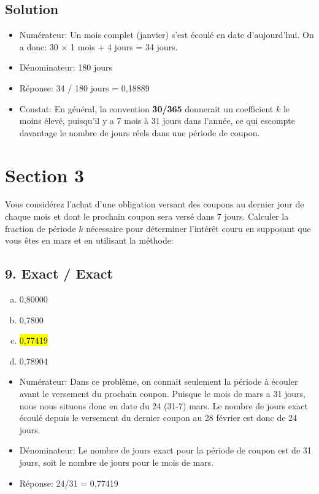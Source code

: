 \documentclass[10pt,a4paper]{article}
\begin{document}
\subsection*{Solution}
\begin{itemize}
\item Numérateur: Un mois complet (janvier) s'est écoulé en date d'aujourd'hui. On a donc: 30  × 1 mois + 4 jours = 34 jours.
\item Dénominateur: 180 jours
\item Réponse: 34 / 180 jours = 0,18889
\item Constat: En général, la convention \textbf{30/365} donnerait un coefficient $k$ le moins élevé,  puisqu'il y a 7 mois à 31 jours dans l'année, ce qui escompte davantage le nombre de jours réels dans une période de coupon.
\end{itemize}
\newpage 


\section*{Section 3}
Vous considérez l’achat d’une obligation versant des coupons au dernier jour de chaque mois et dont le prochain coupon sera versé dans 7 jours. Calculer la fraction de période $k$ nécessaire pour déterminer l’intérêt couru en supposant que vous êtes en mars et en utilisant la méthode: 

\subsection*{9.  Exact / Exact} 
\begin{enumerate}[a)]
\item 0,80000 
\item 0,7800
\item \hl{0,77419}
\item 0,78904 
\end{enumerate}
\begin{itemize}
\item Numérateur: Dans ce problème, on connait seulement la période à écouler avant le versement du prochain coupon.  Puisque le mois de mars a 31 jours, nous nous situons donc en date du 24 (31-7) mars. Le nombre de jours exact écoulé depuis le versement du dernier coupon au 28 février est donc de 24 jours. 
\item Dénominateur: Le nombre de jours exact pour la période de coupon est de 31 jours, soit le nombre de jours pour le mois de mars.
\item Réponse: 24/31 = 0,77419 
\end{itemize}
\end{document}
